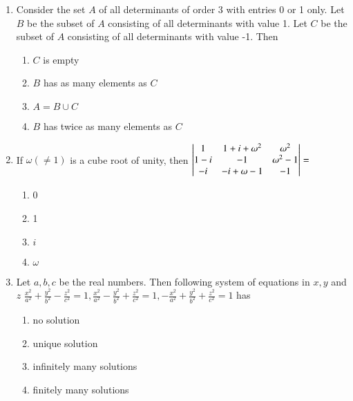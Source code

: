 \documentclass[journal,12pt,twocolumn]{IEEEtran}
\theoremstyle{remark}
\begin{document}
\begin{enumerate}
	\item Consider the set $A$ of all determinants of order 3 with entries
		0 or 1 only. Let $B$ be the subset of $A$ consisting of all
		determinants with value 1. Let $C$ be the subset of $A$ consisting
		of all determinants with value -1. Then
		\hfill {}
		\begin{enumerate}
			\item $C$ is empty
			\item $B$ has as many elements as $C$
			\item $A = B \cup C$
			\item $B$ has twice as many elements as $C$
		\end{enumerate}

	\item If $\omega (\ne 1)$ is a cube root of unity, then
		$\begin{vmatrix}
			1 & 1 + i + \omega^2 & \omega^2 \\
			1 - i & -1 & \omega^2 - 1 \\
			-i & -i + \omega - 1 & -1
		\end{vmatrix} = $
		\hfill {}
	
		\begin{multicols}{4}
			\begin{enumerate}
				\item 0
				\item 1
				\item $i$
				\item $\omega$
			\end{enumerate}
		\end{multicols}

	\item Let $a, b, c$ be the real numbers. Then following system of
		equations in $x, y$ and $z$ 
		\hfill {}
		$
		\frac{x^2}{a^2} + \frac{y^2}{b^2} - \frac{z^2}{c^2} = 1	,
		\frac{x^2}{a^2} - \frac{y^2}{b^2} + \frac{z^2}{c^2} = 1	,
		-\frac{x^2}{a^2} + \frac{y^2}{b^2} + \frac{z^2}{c^2} = 1
		$ has

		\begin{multicols}{2}
			\begin{enumerate}
				\item no solution
				\item unique solution
				\columnbreak
				\item infinitely many solutions
				\item finitely many solutions
			\end{enumerate}
		\end{multicols}


\end{enumerate}
\end{document}
